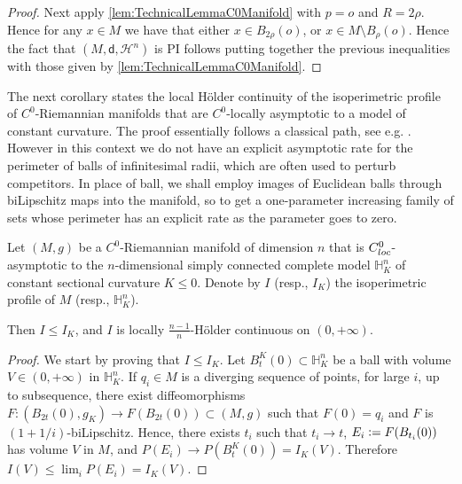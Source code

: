 \documentclass[a4paper,12pt,reqno]{amsart}
\numberwithin{equation}{section}
\theoremstyle{plain}
\theoremstyle{definition}
\theoremstyle{remark}
\newcommand{\eqdef}{\ensuremath{\vcentcolon=}}
\newcommand{\haus}{\mathcal{H}}
\newcommand{\dist}{\mathsf{d}}
\begin{document}
{\begin{proof}
    Next apply \cref{lem:TechnicalLemmaC0Manifold} with $p=o$ and $R=2\rho$. Hence for any $x \in M$ we have that either $x \in B_{2\rho}(o)$, or $x\in M \setminus B_\rho(o)$. Hence the fact that $(M,\dist,\haus^n)$ is PI follows putting together the previous inequalities with those given by \cref{lem:TechnicalLemmaC0Manifold}.
\end{proof}

The next corollary states the local H\"{o}lder continuity of the isoperimetric profile of $C^0$-Riemannian manifolds that are $C^0$-locally asymptotic to a model of constant curvature. The proof essentially follows a classical path, see e.g. \cite[Lemma 2.23]{ANP}. However in this context we do not have an explicit asymptotic rate for the perimeter of balls of infinitesimal radii, which are often used to perturb competitors. In place of ball, we shall employ images of Euclidean balls through biLipschitz maps into the manifold, so to get a one-parameter increasing family of sets whose perimeter has an explicit rate as the parameter goes to zero.

\begin{corollary}\label{cor:Continuity}
Let $(M,g)$ be a $C^0$-Riemannian manifold of dimension $n$ that is $C^0_{\rm loc}$-asymptotic to the $n$-dimensional simply connected complete model $\mathbb H^n_K$ of constant sectional curvature $K\le 0$. Denote by $I$ (resp., $I_K$) the isoperimetric profile of $M$ (resp., $\mathbb{H}^n_K$).

Then $I\le I_K$, and $I$ is locally $\tfrac{n-1}{n}$-H\"{o}lder continuous on $(0,+\infty)$.
\end{corollary}

\begin{proof}
We start by proving that $I\le I_K$. Let $B_t^K(0)\subset \mathbb{H}^n_K$ be a ball with volume $V\in(0,+\infty)$ in $\mathbb{H}^n_K$. If $q_i\in M$ is a diverging sequence of points, for large $i$, up to subsequence, there exist diffeomorphisms $F:(B_{2t}(0), g_K) \to F(B_{2t}(0)) \subset (M,g)$ such that $F(0)=q_i$ and $F$ is $(1+1/i)$-biLipschitz. Hence, there exists $t_i$ such that $t_i\to t$, $E_i\eqdef F(B_{t_i}(0))$ has volume $V$ in $M$, and $P(E_i) \to P(B_t^K(0)) = I_K(V)$. Therefore $I(V) \le \lim_i P(E_i) = I_K(V)$.


\end{proof}}
\end{document}
